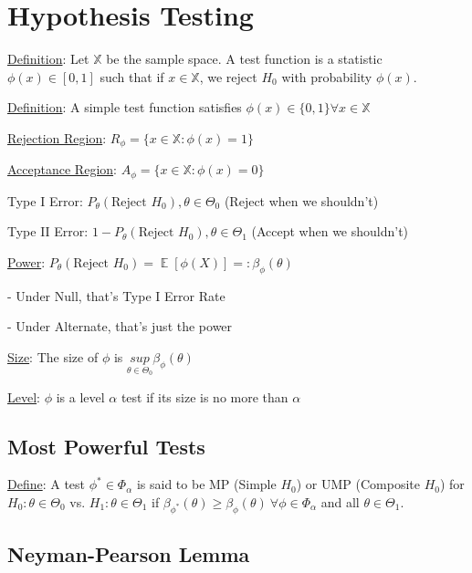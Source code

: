 \documentclass{article}
\DeclareMathOperator{\EX}{\mathbb{E}} %
\begin{document}

\section{Hypothesis Testing}

\underline{Definition}: Let $\mathbb{X}$ be the sample space. A test function is a statistic $\phi(x) \in [0, 1]$ such that if $x \in \mathbb{X}$, we reject $H_0$ with probability $\phi(x)$.

\underline{Definition}: A simple test function satisfies $\phi(x) \in \{0, 1\} \forall x \in \mathbb{X}$

\underline{Rejection Region}: $R_{\phi} = \{x \in \mathbb{X}: \phi(x) = 1\}$ 

\underline{Acceptance Region}: $A_{\phi} = \{x \in \mathbb{X}: \phi(x) = 0\}$ 

Type I Error: $P_{\theta}(\text{Reject } H_0), \theta \in \Theta_0$ (Reject when we shouldn't)

Type II Error: $1 - P_{\theta}(\text{Reject } H_0), \theta \in \Theta_1$ (Accept when we shouldn't)

\underline{Power}: $P_{\theta}(\text{Reject } H_0) = \EX[\phi(X)] =: \beta_{\phi}(\theta)$

- Under Null, that's Type I Error Rate

- Under Alternate, that's just the power

\underline{Size}: The size of $\phi$ is $\underset{\theta \in \Theta_0}{sup}\beta_{\phi}(\theta)$

\underline{Level}: $\phi$ is a level $\alpha$ test if its size is no more than $\alpha$

\subsection{Most Powerful Tests}

\underline{Define}: A test $\phi^* \in \Phi_{\alpha}$ is said to be MP (Simple $H_0$) or UMP (Composite $H_0$) for $H_0: \theta \in \Theta_0$ vs. $H_1: \theta \in \Theta_1$ if $\beta_{\phi^*}(\theta) \ge \beta_{\phi}(\theta) \ \forall \phi \in \Phi_{\alpha}$ and all $\theta \in \Theta_1$.

\subsection{Neyman-Pearson Lemma}
\end{document}
